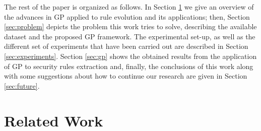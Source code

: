 \documentclass[a4paper,10pt,twocolumn,preprint,3p]{elsarticle}
\begin{document}

The rest of the paper is organized as follows. In Section \ref{sec:SotA} we give an overview of the advances in GP applied to rule evolution and its applications; then, Section \ref{sec:problem} depicts the problem this work tries to solve, describing the available dataset and the proposed GP framework. The experimental set-up, as well as the different set of experiments that have been carried out are described in Section \ref{sec:experiments}. Section \ref{sec:gp} shows the obtained results from the application of GP to security rules extraction and, finally, the conclusions of this work along with some suggestions about how to continue our research are given in Section \ref{sec:future}. 

\section{Related Work}
\label{sec:SotA}

\end{document}
